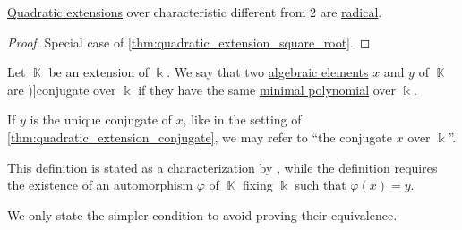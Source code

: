 \begin{corollary}\label{thm:quadratic_extension_is_radical}
  \hyperref[def:field_extension_degree]{Quadratic extensions} over characteristic different from \( 2 \) are \hyperref[def:radical_extension]{radical}.
\end{corollary}
\begin{proof}
  Special case of \cref{thm:quadratic_extension_square_root}.
\end{proof}

\begin{definition}\label{def:conjugate_algebraic_element}
  Let \( \BbbK \) be an extension of \( \Bbbk \). We say that two \hyperref[def:algebraic_element]{algebraic elements} \( x \) and \( y \) of \( \BbbK \) are \term[en=conjugate (elements) (\cite[def. V.9.1]{Bourbaki2003Algebra4to7})]{conjugate} over \( \Bbbk \) if they have the same \hyperref[def:algebraic_element_minimal_polynomial]{minimal polynomial} over \( \Bbbk \).
\end{definition}
\begin{comments}
  \item If \( y \) is the unique conjugate of \( x \), like in the setting of \cref{thm:quadratic_extension_conjugate}, we may refer to \enquote{the conjugate \( x \) over \( \Bbbk \)}.

  \item This definition is stated as a characterization by \textcite[prop. V.9.2(c)]{Bourbaki2003Algebra4to7}, while the definition requires the existence of an automorphism \( \varphi \) of \( \BbbK \) fixing \( \Bbbk \) such that \( \varphi(x) = y \).

  We only state the simpler condition to avoid proving their equivalence.
\end{comments}

